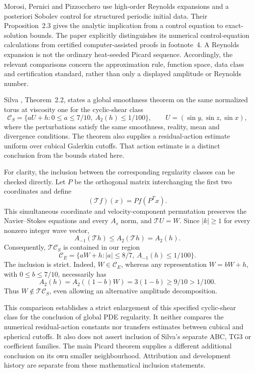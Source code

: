 Morosi, Pernici and Pizzocchero \cite{Morosi2014} use high-order Reynolds expansions and a posteriori Sobolev control for structured periodic initial data. Their Proposition~2.3 gives the analytic implication from a control equation to exact-solution bounds. The paper explicitly distinguishes its numerical control-equation calculations from certified computer-assisted proofs in footnote~4. A Reynolds expansion is not the ordinary heat-seeded Picard sequence. Accordingly, the relevant comparisons concern the approximation rule, function space, data class and certification standard, rather than only a displayed amplitude or Reynolds number.

Silva \cite{Silva2026}, Theorem~2.2, states a global smoothness theorem on the same normalized torus at viscosity one for the cyclic-shear class
\[
 \mathcal C_S=
 \{aU+h:0\le a\le7/10,\ A_2(h)\le1/100\},
 \qquad U=(\sin y,\sin z,\sin x),
\]
where the perturbations satisfy the same smoothness, reality, mean and divergence conditions. The theorem also supplies a residual-action estimate uniform over cubical Galerkin cutoffs. That action estimate is a distinct conclusion from the bounds stated here.

For clarity, the inclusion between the corresponding regularity classes can be checked directly. Let \(P\) be the orthogonal matrix interchanging the first two coordinates and define
\[
 (\mathcal T f)(x)=P f(P^T x).
\]
This simultaneous coordinate and velocity-component permutation preserves the Navier--Stokes equations and every \(A_s\) norm, and \(\mathcal T U=W\). Since \(|k|\ge1\) for every nonzero integer wave vector,
\[
 A_{-1}(\mathcal T h)\le A_2(\mathcal T h)=A_2(h).
\]
Consequently, \(\mathcal T\mathcal C_S\) is contained in our region
\[
 \mathcal C_E=
 \{aW+h:|a|\le8/7,\ A_{-1}(h)\le1/100\}.
\]
The inclusion is strict. Indeed, \(W\in\mathcal C_E\), whereas any representation \(W=bW+h\), with \(0\le b\le7/10\), necessarily has
\[
 A_2(h)=A_2((1-b)W)=3(1-b)\ge9/10>1/100.
\]
Thus \(W\notin\mathcal T\mathcal C_S\), even allowing an alternative amplitude decomposition.

This comparison establishes a strict enlargement of this specified cyclic-shear class for the conclusion of global PDE regularity. It neither compares the numerical residual-action constants nor transfers estimates between cubical and spherical cutoffs. It also does not assert inclusion of Silva's separate ABC, TG3 or coefficient families. The main Picard theorem supplies a different additional conclusion on its own smaller neighbourhood. Attribution and development history are separate from these mathematical inclusion statements.
